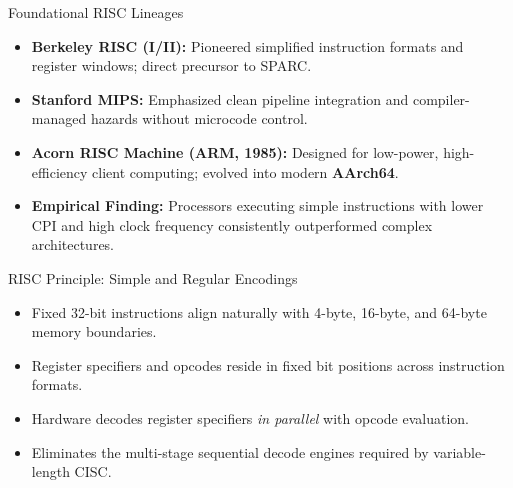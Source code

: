 \documentclass[aspectratio=169,11pt,t]{beamer}
\newcommand{\key}[1]{\textbf{#1}}
\begin{document}
\begin{frame}{Foundational RISC Lineages}
\large
\begin{itemize}\setlength{\itemsep}{8pt}
  \item \key{Berkeley RISC (I/II):} Pioneered simplified instruction formats and register windows; direct precursor to SPARC.
  \item \key{Stanford MIPS:} Emphasized clean pipeline integration and compiler-managed hazards without microcode control.
  \item \key{Acorn RISC Machine (ARM, 1985):} Designed for low-power, high-efficiency client computing; evolved into modern \key{AArch64}.
  \item \key{Empirical Finding:} Processors executing simple instructions with lower CPI and high clock frequency consistently outperformed complex architectures.
\end{itemize}
\end{frame}


\begin{frame}{RISC Principle: Simple and Regular Encodings}
\large
\begin{itemize}\setlength{\itemsep}{8pt}
  \item Fixed 32-bit instructions align naturally with 4-byte, 16-byte, and 64-byte memory boundaries.
  \item Register specifiers and opcodes reside in fixed bit positions across instruction formats.
  \item Hardware decodes register specifiers \emph{in parallel} with opcode evaluation.
  \item Eliminates the multi-stage sequential decode engines required by variable-length CISC.
\end{itemize}
\end{frame}

\end{document}
